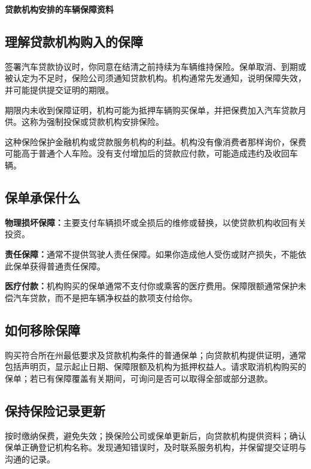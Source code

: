 \documentclass[UTF8,fontset=none,11pt,a4paper]{ctexart}
\begin{document}
{\noindent\fontsize{20}{25}\selectfont\bfseries 贷款机构安排的车辆保障资料\par}
\vspace{10pt}
\subsection*{理解贷款机构购入的保障}
签署汽车贷款协议时，你同意在结清之前持续为车辆维持保险。保单取消、到期或被认定为不足时，保险公司须通知贷款机构。机构通常先发通知，说明保障失效，并可能提供提交证明的期限。


期限内未收到保障证明，机构可能为抵押车辆购买保单，并把保费加入汽车贷款月供。这称为强制投保或贷款机构安排保险。


这种保险保护金融机构或贷款服务机构的利益。机构没有像消费者那样询价，保费可能高于普通个人车险。没有支付增加后的贷款应付款，可能造成违约及收回车辆。


\subsection*{保单承保什么}
\textbf{物理损坏保障：}主要支付车辆损坏或全损后的维修或替换，以使贷款机构收回有关投资。


\textbf{责任保障：}通常不提供驾驶人责任保障。如果你造成他人受伤或财产损失，不能依此保单获得普通责任保障。


\textbf{医疗付款：}机构购买的保单通常不支付你或乘客的医疗费用。保障限额通常保护未偿汽车贷款，而不是把车辆净权益的款项支付给你。


\subsection*{如何移除保障}
购买符合所在州最低要求及贷款机构条件的普通保单；向贷款机构提供证明，通常包括声明页，显示起止日期、保障限额及机构为抵押权益人。请求取消机构购买的保单；若已有保障覆盖有关期间，可询问是否可以取得全部或部分退款。


\subsection*{保持保险记录更新}
按时缴纳保费，避免失效；换保险公司或保单更新后，向贷款机构提供资料；确认保单正确登记机构名称。发现通知错误时，及时联系服务机构，并保留提交证明与沟通的记录。
\end{document}
